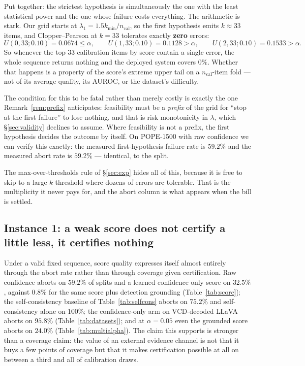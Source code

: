 \documentclass{article}
\theoremstyle{plain}
\theoremstyle{definition}
\theoremstyle{remark}
\begin{document}
Put together: the strictest hypothesis is simultaneously the one with the least statistical power
and the one whose failure costs everything. The arithmetic is stark. Our grid starts at
$\lambda_1=1.5k_{\min}/n_{\mathrm{cal}}$, so the first hypothesis emits $k\approx33$ items, and
Clopper--Pearson at $k=33$ tolerates exactly \textbf{zero} errors:
\[
U(0,33;0.10)=0.0674\le\alpha,\qquad U(1,33;0.10)=0.1128>\alpha,\qquad U(2,33;0.10)=0.1533>\alpha.
\]
So whenever the top $33$ calibration items by score contain a single error, the whole sequence
returns nothing and the deployed system covers $0\%$. Whether that happens is a property of the
score's extreme upper tail on a $n_{\mathrm{cal}}$-item fold --- not of its average quality, its
AUROC, or the dataset's difficulty.

The condition for this to be fatal rather than merely costly is exactly the one
Remark~\ref{rem:prefix} anticipates: feasibility must be a \emph{prefix} of the grid for
``stop at the first failure'' to lose nothing, and that is risk monotonicity in $\lambda$, which
\S\ref{sec:validity} declines to assume. Where feasibility is not a prefix, the first hypothesis
decides the outcome by itself. On POPE-1500 with raw confidence we can verify this exactly: the
measured first-hypothesis failure rate is $59.2\%$ and the measured abort rate is $59.2\%$ ---
identical, to the split.

The max-over-thresholds rule of \S\ref{sec:exp} hides all of this, because it is free to skip to a
large-$k$ threshold where dozens of errors are tolerable. That is the multiplicity it never pays
for, and the abort column is what appears when the bill is settled.

\subsection{Instance 1: a weak score does not certify a little less, it certifies nothing}

Under a valid fixed sequence, score quality expresses itself almost entirely through the abort
rate rather than through coverage given certification. Raw confidence aborts on $59.2\%$ of
splits and a learned confidence-only score on $32.5\%$, against $0.8\%$ for the same score plus
detection grounding (Table~\ref{tab:score}); the self-consistency baseline of
Table~\ref{tab:selfcons} aborts on $75.2\%$ and self-consistency alone on $100\%$; the
confidence-only arm on VCD-decoded LLaVA aborts on $95.8\%$ (Table~\ref{tab:datasets}); and at
$\alpha=0.05$ even the grounded score aborts on $24.0\%$ (Table~\ref{tab:multialpha}). The claim
this supports is stronger than a coverage claim: the value of an external evidence channel is not
that it buys a few points of coverage but that it makes certification possible at all on between
a third and all of calibration draws.
\end{document}
